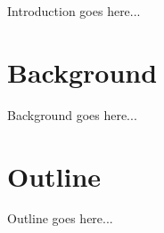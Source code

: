 \doublespacing
Introduction goes here...

\singlespacing
\section{Background}

\doublespacing
Background goes here...

\singlespacing
\section{Outline}

\doublespacing
Outline goes here...